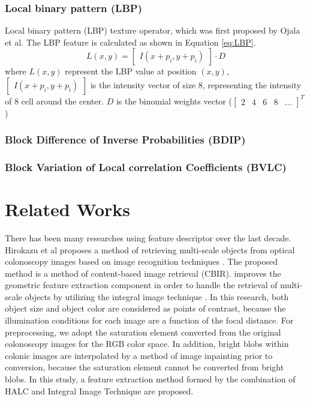 \documentclass{article}
\newcommand{\irow}[1]{%
	\begin{bmatrix}#1\end{bmatrix}%
}
\begin{document}
	\subsubsection{Local binary pattern (LBP)}
	Local binary pattern (LBP) texture operator, which was first proposed by Ojala et al. The LBP feature is calculated as shown in Equation \ref{eq:LBP}.
	\begin{equation}
		L(x, y) = \irow{I(x + p_i, y + p_i)} \cdot D
		\label{eq:LBP}
	\end{equation} 
	where $L(x, y)$ represent the LBP value at position $(x, y)$,  $\irow{I(x + p_i, y + p_i)}$ is the intensity vector of size 8, representing the intensity of 8 cell around the center. $D$ is the binomial weights vector ($\irow{2 & 4 & 6 & 8 & \dots}^T$)
	\subsubsection{Block Difference of Inverse Probabilities (BDIP)}
	\subsubsection{Block Variation of Local correlation Coefficients (BVLC)}
	\section{Related Works}
	
	There has been many researches using feature descriptor over the last decade. Hirokazu et al proposes a method of retrieving multi-scale objects from optical colonoscopy images based on image recognition techniques \cite{7348442}. The proposed method is a method of content-based image retrieval (CBIR). \cite{7348442} improves the geometric feature extraction component in order to handle the retrieval of multi-scale objects	by utilizing the integral image technique \cite{207-212}. In this research, both object size and	object color are considered as points of contrast, because the illumination conditions for each image are a function of the focal distance. For preprocessing, we adopt the saturation element converted from the original colonoscopy images for the	RGB color space. In addition, bright blobs within colonic
	images are interpolated by a method of image inpainting \cite{25-36}
	prior to conversion, because the saturation element cannot be
	converted from bright blobs. In this study, a feature extraction method formed by the combination of HALC \cite{halc} and Integral Image Technique \cite{25-36} are proposed. 
	
\end{document}
